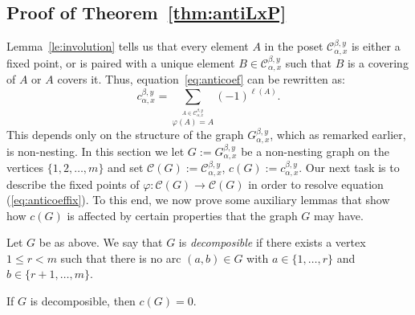 \subsection{Proof of Theorem~\ref{thm:antiLxP}}\label{ss:proof1} Lemma~\ref{le:involution} tells us that every element $A$ in the poset $\mathcal{C}_{\alpha,x}^{\beta,y}$ is either a fixed point, or is paired with a unique element $B\in\mathcal{C}_{\alpha,x}^{\beta,y}$ such that $B$ is a covering of $A$ or $A$ covers it. Thus, equation~\eqref{eq:anticoef} can be rewritten as:
\begin{equation}\label{eq:anticoeffix}
 c_{\alpha,x}^{\beta,y}=\sum_{\stackrel{A\in \mathcal{C}_{\alpha,x}^{\beta,y}} %
 {\varphi(A)=A}} (-1)^{\ell(A)}.
\end{equation}
This depends only on the structure of the graph $G_{\alpha,x}^{\beta,y}$, which as remarked earlier, is non-nesting. In this section we let $G:=G_{\alpha,x}^{\beta,y}$ be a non-nesting graph on the vertices $\{1,2,\ldots, m\}$ and set $\mathcal{C}(G):= \mathcal{C}_{\alpha,x}^{\beta,y}$, $c(G) := c_{\alpha,x}^{\beta,y}$. Our next task is to describe the fixed points of $\varphi\colon \mathcal{C}(G)\to \mathcal{C}(G)$ in order to resolve equation (\ref{eq:anticoeffix}). To this end, we now prove some auxiliary lemmas that show how $c(G)$ is affected by certain properties that the graph $G$ may have.

\begin{defi}\label{def:decomposible}
Let $G$ be as above. We say that $G$ is \emph{decomposible} if there exists a vertex $1\leq r<m$ such that there is no arc $(a,b)\in G$ with $a\in\{1,\dots ,r\}$ and $b\in\{r+1,\dots,m\}$.

\end{defi}

\begin{lemma}\label{le:decomposible}
 If $G$ is decomposible, then $c(G)=0$.
\end{lemma}

